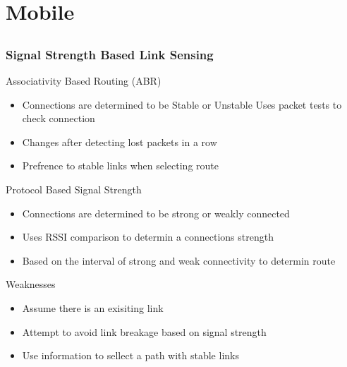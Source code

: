 \section{Mobile}
\subsection*{}


\begin{frame}[t]
  \frametitle{Signal Strength Based Link Sensing}
  
  Associativity Based Routing (ABR)
  \begin{itemize}
  \item Connections are determined to be Stable or Unstable
  \irem Uses packet tests to check connection
  \item Changes after detecting lost packets in a row
  \item Prefrence to stable links when selecting route
  \end{itemize}

  \vfill
  
  Protocol Based Signal Strength
  \begin{itemize}
  \item Connections are determined to be strong or weakly connected
  \item Uses RSSI comparison to determin a connections strength
  \item Based on the interval of strong and weak connectivity to determin route
  \end{itemize}

  \vfill

  Weaknesses
  \begin{itemize}
    \item Assume there is an exisiting link
    \item Attempt to avoid link breakage based on signal strength
    \item Use information to sellect a path with stable links
  \end{itemize}

  \vfill

  \begin{flushleft}
    \begin{tiny}
      \begin{minipage}{1.0\linewidth}
      \end{minipage}
    \end{tiny}
  \end{flushleft}
  
\end{frame}

